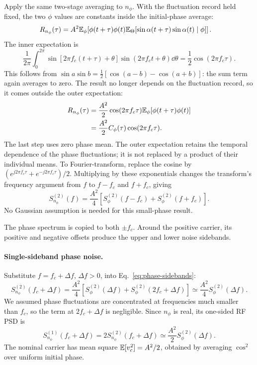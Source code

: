 Apply the same two-stage averaging to $n_\phi$. With the fluctuation record held fixed, the two $\phi$ values are constants inside the initial-phase average:
\begin{align*}
R_{n_\phi}(\tau)
&=A^2\mathbb E_\phi\!\left[\phi(t+\tau)\phi(t)
\mathbb E_\Theta[\sin\alpha(t+\tau)\sin\alpha(t)\mid\phi]\right].
\end{align*}
The inner expectation is
\[
\frac1{2\pi}\int_0^{2\pi}
\sin[2\pi f_c(t+\tau)+\theta]\sin(2\pi f_ct+\theta)\dd\theta
=\frac12\cos(2\pi f_c\tau).
\]
This follows from $\sin a\sin b=\tfrac12[\cos(a-b)-\cos(a+b)]$: the sum term again averages to zero. The result no longer depends on the fluctuation record, so it comes outside the outer expectation:
\begin{align*}
R_{n_\phi}(\tau)
&=\frac{A^2}{2}\cos(2\pi f_c\tau)\mathbb E_\phi[\phi(t+\tau)\phi(t)]\\
&=\frac{A^2}{2}C_\phi(\tau)\cos(2\pi f_c\tau).
\end{align*}
The last step uses zero phase mean. The outer expectation retains the temporal dependence of the phase fluctuations; it is not replaced by a product of their individual means.
To Fourier-transform, replace the cosine by $(e^{j2\pi f_c\tau}+e^{-j2\pi f_c\tau})/2$. Multiplying by these exponentials changes the transform's frequency argument from $f$ to $f-f_c$ and $f+f_c$, giving
\begin{equation}
S_{n_\phi}^{(2)}(f)=\frac{A^2}{4}
[S_\phi^{(2)}(f-f_c)+S_\phi^{(2)}(f+f_c)].
\label{eq:phase-sidebands}
\end{equation}
No Gaussian assumption is needed for this small-phase result.

The phase spectrum is copied to both $\pm f_c$. Around the positive carrier, its positive and negative offsets produce the upper and lower noise sidebands.

\paragraph{Single-sideband phase noise.}
Substitute $f=f_c+\Delta f$, $\Delta f>0$, into Eq.~\eqref{eq:phase-sidebands}:
\[
S_{n_\phi}^{(2)}(f_c+\Delta f)
=\frac{A^2}{4}\left[
S_\phi^{(2)}(\Delta f)+S_\phi^{(2)}(2f_c+\Delta f)\right]
\simeq\frac{A^2}{4}S_\phi^{(2)}(\Delta f).
\]
We assumed phase fluctuations are concentrated at frequencies much smaller than $f_c$, so the term at $2f_c+\Delta f$ is negligible. Since $n_\phi$ is real, its one-sided RF PSD is
\[
S_{n_\phi}^{(1)}(f_c+\Delta f)
=2S_{n_\phi}^{(2)}(f_c+\Delta f)
\simeq\frac{A^2}{2}S_\phi^{(2)}(\Delta f).
\]
The nominal carrier has mean square $\mathbb E[v_c^2]=A^2/2$, obtained by averaging $\cos^2$ over uniform initial phase.

